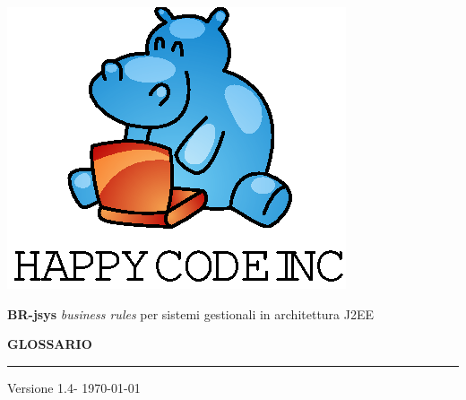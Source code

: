 \documentclass[11pt,titlepage,a4paper]{report}
\begin{document}
\newcommand{\lv}{1.4} %


\begin{titlepage}
\begin{center}
\vspace*{0.5in}
\includegraphics{logo.eps}
\vspace*{0.2in}

{\Large \textbf{BR-jsys}}
{\Large \emph{business rules} per sistemi gestionali in architettura J2EE } 
\vspace{2in}

\LARGE \textbf {GLOSSARIO}
\par\rule{10cm}{0.4pt} \par {\large Versione \lv - \today}


\end{center}
\end{titlepage}
\vspace*{0.5in}
\end{document}

